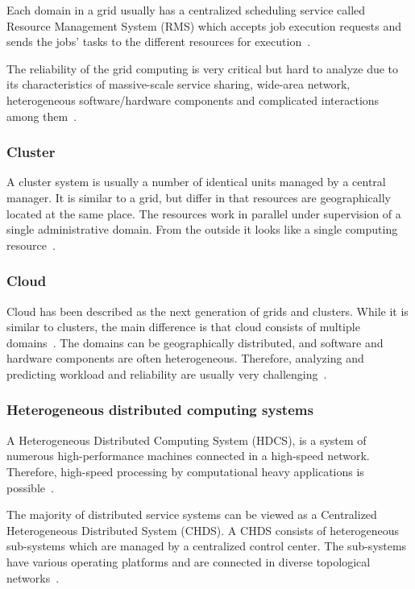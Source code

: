 \documentclass{cslthse-msc}
\begin{document}
Each domain in a grid usually has a centralized scheduling service called Resource Management System (RMS) which accepts job execution requests and sends the jobs' tasks to the different resources for execution~\cite{evalOfGridRel}.

The reliability of the grid computing is very critical but hard to analyze due to its characteristics of massive-scale service sharing, wide-area network, heterogeneous software/hardware components and complicated interactions among them~\cite{cloudServiceRel}.

\subsubsection{Cluster}
A cluster system is usually a number of identical units managed by a central manager. It is similar to a grid, but differ in that resources are geographically located at the same place. The resources work in parallel under supervision of a single administrative domain. From the outside it looks like a single computing resource~\cite{compStudyLoadAndCloud}.

\subsubsection{Cloud}
Cloud has been described as the next generation of grids and clusters. While it is similar to clusters, the main difference is that cloud consists of multiple domains~\cite{compStudyLoadAndCloud}. The domains can be geographically distributed, and software and hardware components are often heterogeneous. Therefore, analyzing and predicting workload and reliability are usually very challenging~\cite{surveyReliabilityDistr}.

\subsubsection{Heterogeneous distributed computing systems}
A Heterogeneous Distributed Computing System (HDCS), is a system of numerous high-performance machines connected in a high-speed network. Therefore, high-speed processing by computational heavy applications is possible~\cite{algoMinExTime}. %

The majority of distributed service systems can be viewed as a Centralized Heterogeneous Distributed System (CHDS). A CHDS consists of heterogeneous sub-systems which are managed by a centralized control center. The sub-systems have various operating platforms and are connected in diverse topological networks~\cite{studyServiceRel}.
\end{document}
